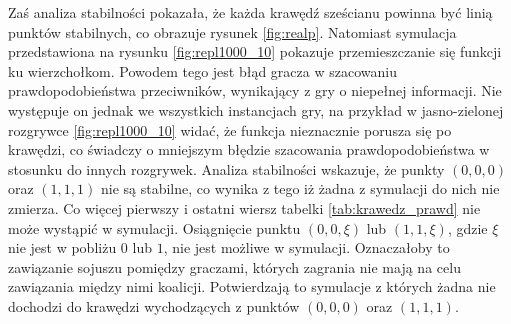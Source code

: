 Zaś analiza stabilności pokazała, że każda krawędź sześcianu powinna być linią punktów stabilnych, co obrazuje rysunek \ref{fig:realp}. Natomiast symulacja przedstawiona na rysunku \ref{fig:repl1000_10} pokazuje przemieszczanie się funkcji ku wierzchołkom. Powodem tego jest błąd gracza w szacowaniu prawdopodobieństwa przeciwników, wynikający z gry o niepełnej informacji. Nie występuje on jednak we wszystkich instancjach gry, na przykład w jasno-zielonej rozgrywce \ref{fig:repl1000_10} widać, że funkcja nieznacznie porusza się po krawędzi, co świadczy o mniejszym błędzie szacowania prawdopodobieństwa w stosunku do innych rozgrywek. Analiza stabilności wskazuje, że punkty $(0,0,0)$ oraz $(1,1,1)$ nie są stabilne, co wynika z tego iż żadna z symulacji do nich nie zmierza. Co więcej pierwszy i ostatni wiersz tabelki \ref{tab:krawedz_prawd} nie może wystąpić w symulacji. Osiągnięcie punktu $(0,0,\xi )$ lub $(1,1,\xi )$, gdzie $\xi$ nie jest w pobliżu $0$ lub $1$, nie jest możliwe w symulacji. Oznaczałoby to zawiązanie sojuszu pomiędzy graczami, których zagrania nie mają na celu zawiązania między nimi koalicji. Potwierdzają to symulacje z których żadna nie dochodzi do krawędzi wychodzących z punktów $(0,0,0)$ oraz $(1,1,1)$.

